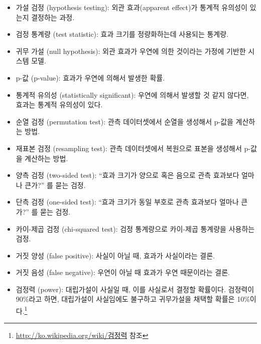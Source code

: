 \begin{itemize}

\item 가설 검정 (hypothesis testing): 외관 효과(apparent effect)가 통계적 유의성이 있는지 결정하는 과정.

\item 검정 통계량 (test statistic): 효과 크기를 정량화하는데 사용되는 통계량.

\item 귀무 가설 (null hypothesis): 외관 효과가 우연에 의한 것이라는 가정에 기반한 시스템 모델.

\item p-값 (p-value): 효과가 우연에 의해서 발생한 확률.

\item 통계적 유의성 (statistically significant): 우연에 의해서 발생할 것 같지 않다면, 효과는 통계적 유의성이 있다.

\item 순열 검정 (permutation test): 관측 데이터셋에서 순열을 생성해서 p-값을 계산하는 방법.

\item 재표본 검정 (resampling test): 관측 데이터셋에서 복원으로 표본을 생성해서 p-값을 계산하는 방법.

\item 양측 검정 (two-sided test): ``효과 크기가 양으로 혹은 음으로 관측 효과보다 얼마나 큰가?'' 를 묻는 검정.

\item 단측 검정 (one-sided test): ``효과 크기가 동일 부호로 관측 효과보다 얼마나 큰가?'' 를 묻는 검정.

\item 카이-제곱 검정 (chi-squared test): 검정 통계량으로 카이-제곱 통계량을 사용하는 검정.

\item 거짓 양성 (false positive): 사실이 아닐 때, 효과가 사실이라는 결론.

\item 거짓 음성 (false negative): 우연이 아닐 때 효과가 우연 때문이라는 결론.

\item 검정력 (power): 대립가설이 사실일 때, 이를 사실로서 결정할 확률이다. 검정력이 90\%라고 하면, 대립가설이 사실임에도 불구하고 귀무가설을 채택할 확률은 10\%이다.\footnote{\url{http://ko.wikipedia.org/wiki/검정력} 참조}

\end{itemize}



